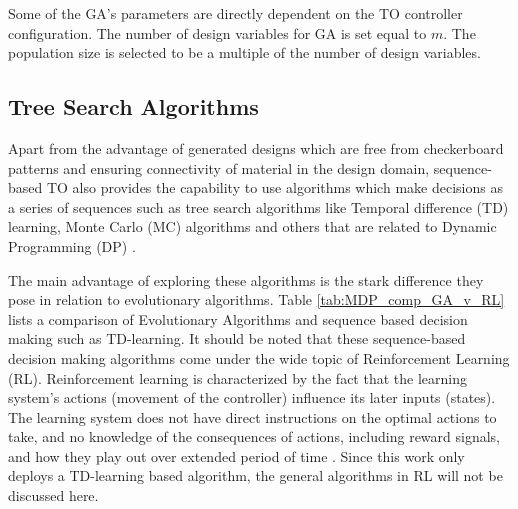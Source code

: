 Some of the GA’s parameters are directly dependent on the TO controller configuration. The number of design variables for GA is set equal to $m$. The population size is selected to be a multiple of the number of design variables.

\subsection{Tree Search Algorithms}
\label{section:MDP_TD_learning}

Apart from the advantage of generated designs which are free from checkerboard patterns and ensuring connectivity of material in the design domain, sequence-based TO also provides the capability to use algorithms which make decisions as a series of sequences such as tree search algorithms like Temporal difference (TD) learning, Monte Carlo (MC) algorithms and others that are related to Dynamic Programming (DP) \parencite{sutton1988learning}. 

The main advantage of exploring these algorithms is the stark difference they pose in relation to evolutionary algorithms. Table \ref{tab:MDP_comp_GA_v_RL} lists a comparison of Evolutionary Algorithms and sequence based decision making such as TD-learning. It should be noted that these sequence-based decision making algorithms come under the wide topic of Reinforcement Learning (RL). Reinforcement learning is characterized by the fact that the learning system’s actions (movement of the controller) influence its later inputs (states). The learning system does not have direct instructions on the optimal actions to take, and no knowledge of the consequences of actions, including reward signals, and how they play out over extended period of time \parencite{sutton2018reinforcement}. Since this work only deploys a TD-learning based algorithm, the general algorithms in RL will not be discussed here.

